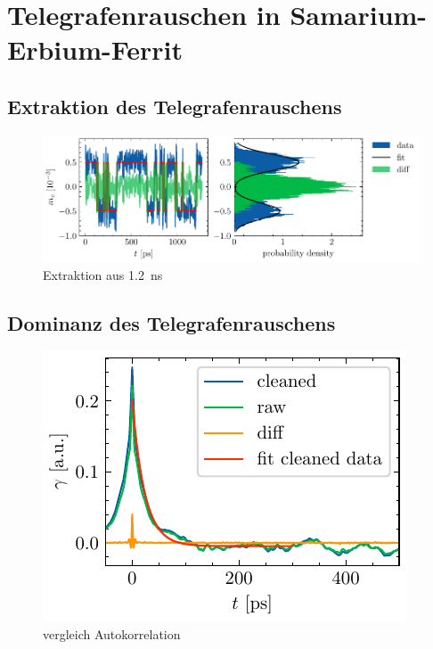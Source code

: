 \documentclass[main.tex]{subfiles}
\begin{document}
\section{Telegrafenrauschen in Samarium-Erbium-Ferrit}

\subsection{Extraktion des Telegrafenrauschens}

\begin{figure}[h]
    \centering
    \includegraphics{bilder/plots/Bz_0mT/mc_fit_hist_part2_26.03meV.pdf}
    \caption{Extraktion aus \SI{1,2}{\nano\s}}\label{fig:Extraktion-ausschnitt}
\end{figure}


\subsection*{Dominanz des Telegrafenrauschens}

\begin{figure}[h]
    \centering
    \includegraphics{bilder/plots/Bz_0mT/autocorr_26.03meV.pdf}
    \caption{vergleich Autokorrelation}\label{fig:autocorr}
\end{figure}
\end{document}
